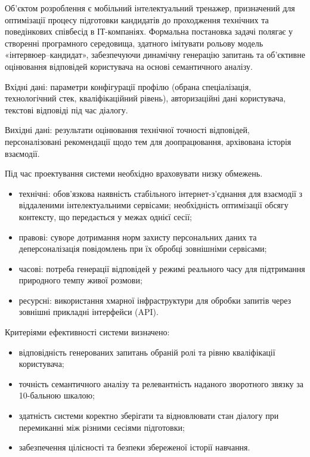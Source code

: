 \documentclass[
]{article}
\begin{document}
Об'єктом розроблення є мобільний інтелектуальний тренажер, призначений
для оптимізації процесу підготовки кандидатів до проходження технічних
та поведінкових співбесід в ІТ-компаніях. Формальна постановка задачі
полягає у створенні програмного середовища, здатного імітувати рольову
модель «інтерв\textquotesingle юер--кандидат», забезпечуючи динамічну
генерацію запитань та об'єктивне оцінювання відповідей користувача на
основі семантичного аналізу.

Вхідні дані: параметри конфігурації профілю (обрана спеціалізація,
технологічний стек, кваліфікаційний рівень), авторизаційні дані
користувача, текстові відповіді під час діалогу.

Вихідні дані: результати оцінювання технічної точності відповідей,
персоналізовані рекомендації щодо тем для доопрацювання, архівована
історія взаємодії.

Під час проектування системи необхідно враховувати низку обмежень.

\begin{itemize}
\item
  технічні: обов'язкова наявність стабільного інтернет-з'єднання для
  взаємодії з віддаленими інтелектуальними сервісами; необхідність
  оптимізації обсягу контексту, що передається у межах однієї сесії;
\item
  правові: суворе дотримання норм захисту персональних даних та
  деперсоналізація повідомлень при їх обробці зовнішніми сервісами;
\item
  часові: потреба генерації відповідей у режимі реального часу для
  підтримання природного темпу живої розмови;
\item
  ресурсні: використання хмарної інфраструктури для обробки запитів
  через зовнішні прикладні інтерфейси (API).
\end{itemize}

Критеріями ефективності системи визначено:

\begin{itemize}
\item
  відповідність генерованих запитань обраній ролі та рівню кваліфікації
  користувача;
\item
  точність семантичного аналізу та релевантність наданого зворотного
  зв\textquotesingle язку за 10-бальною шкалою;
\item
  здатність системи коректно зберігати та відновлювати стан діалогу при
  перемиканні між різними сесіями підготовки;
\item
  забезпечення цілісності та безпеки збереженої історії навчання.
\end{itemize}
\end{document}
